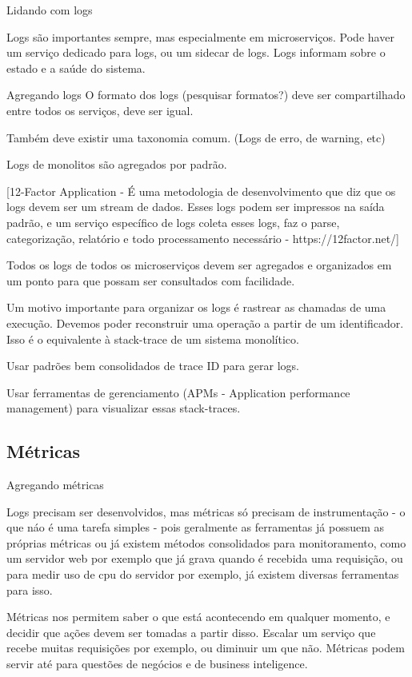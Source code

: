 Lidando com logs

Logs são importantes sempre, mas especialmente em microserviços. Pode haver um serviço dedicado para logs, ou um sidecar de logs. Logs informam sobre o estado e a saúde do sistema.

Agregando logs
O formato dos logs (pesquisar formatos?) deve ser compartilhado entre todos os serviços, deve ser igual.

Também deve existir uma taxonomia comum. (Logs de erro, de warning, etc)

Logs de monolitos são agregados por padrão. 

[12-Factor Application - É uma metodologia de desenvolvimento que diz que os logs devem ser um stream de dados. Esses logs podem ser impressos na saída padrão, e um serviço específico de logs coleta esses logs, faz o parse, categorização, relatório e todo processamento necessário - https://12factor.net/]

Todos os logs de todos os microserviços devem ser agregados e organizados em um ponto para que possam ser consultados com facilidade.

Um motivo importante para organizar os logs é rastrear as chamadas de uma execução. Devemos poder reconstruir uma operação a partir de um identificador. Isso é o equivalente à stack-trace de um sistema monolítico.

Usar padrões bem consolidados de trace ID para gerar logs.

Usar ferramentas de gerenciamento (APMs - Application performance management) para visualizar essas stack-traces.

\subsection{Métricas}

Agregando métricas

Logs precisam ser desenvolvidos, mas métricas só precisam de instrumentação - o que náo é uma tarefa simples - pois geralmente as ferramentas já possuem as próprias métricas ou já existem métodos consolidados para monitoramento, como um servidor web por exemplo que já grava quando é recebida uma requisição, ou para medir uso de cpu do servidor por exemplo, já existem diversas ferramentas para isso.

Métricas nos permitem saber o que está acontecendo em qualquer momento, e decidir que ações devem ser tomadas a partir disso. Escalar um serviço que recebe muitas requisições por exemplo, ou diminuir um que não. Métricas podem servir até para questões de negócios e de business inteligence. 

